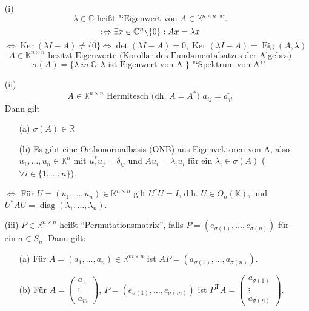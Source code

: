 \documentclass[11pt]{scrartcl}
\newcommand*{\T}{\mathrm T}
\DeclareMathOperator*{\diag}{\mathrm{diag}}
\DeclareMathOperator*{\Ker}{\mathrm{Ker}}
\DeclareMathOperator*{\Eig}{\mathrm{Eig}}
\theoremstyle{break}
\theoremstyle{remark}
\begin{document}
\begin{enumerate}
\item[(i)]
\[
\lambda \in \mathbb{C}\text{ heißt "`Eigenwert von } A \in 
\mathbb{K}^{n \times n} \text{ "'.} \]
\[
: \Leftrightarrow \exists x \in \mathbb{C}^n \backslash \{0\}: Ax = \lambda x \\
\]\[
\Leftrightarrow \Ker (\lambda I -A) \neq \{0\} \Leftrightarrow 
\det (\lambda I -A) = 0, \Ker (\lambda I-A) = \Eig(A, \lambda)
\]\[
A \in \mathbb{K}^{n \times n} \text{ besitzt Eigenwerte (Korollar des 
Fundamentalsatzes der Algebra)}
\]\[
\sigma (A) = \{ \lambda \ in~ \mathbb{C}: \lambda \text{ ist Eigenwert 
von A } \} \text{ "`Spektrum von A"' }
\]
\item[(ii)]
\[
A \in \mathbb{K}^{n \times n} \text{ Hermitesch (dh. } A = A^\ast \text{) } a_{ij} = \bar{a_{ji}}
\]
Dann gilt 
\begin{enumerate}
\item[(a)]
$ \sigma(A) \in \mathbb{R}$
\item[(b)]
Es gibt eine Orthonormalbasis (ONB) aus Eigenvektoren von A, also  $u_1, \dots, u_n \in \mathbb{K}^n$ mit $u_i^{*} u_j = \delta_{ij}$
und $Au_i = \lambda_i u_i$ für ein $\lambda_i \in \sigma(A)$
($\forall i \in \{1, \dots, n\}$).
\end{enumerate}
$\Leftrightarrow$ Für $U = (u_1, \dots, u_n) \in \mathbb{K}^{n\times n}$ gilt $U^\ast U = I$,
d.h. $U \in O_n(\mathbb{K})$, und 
$U^\ast A U = \diag(\lambda_1, \dots, \lambda_n).$
\item[(iii)]
$P \in \mathbb{R}^{n \times n}$ heißt "`Permutationsmatrix"',
falls $P=(e_{\sigma(1)}, \dots, e_{\sigma(n)})$ für ein $\sigma \in S_n$.
Dann gilt:
\begin{enumerate}
  \item[(a)] Für $A = (a_1, \dots, a_n) \in \mathbb{R}^{m \times n}$ ist
  $AP = (a_{\sigma(1)},\dots, a_{\sigma(n)}).$
  \item[(b)]
  Für $A = \begin{pmatrix} a_1 \\ \vdots \\ a_m \end{pmatrix}$,
      $P = (e_{\sigma(1)}, \dots, e_{\sigma(m)})$
  ist $P^\T A = \begin{pmatrix} a_{\sigma(1)} \\ \vdots \\ a_{\sigma(n)} \end{pmatrix}.$
\end{enumerate}
\end{enumerate}
\end{document}
